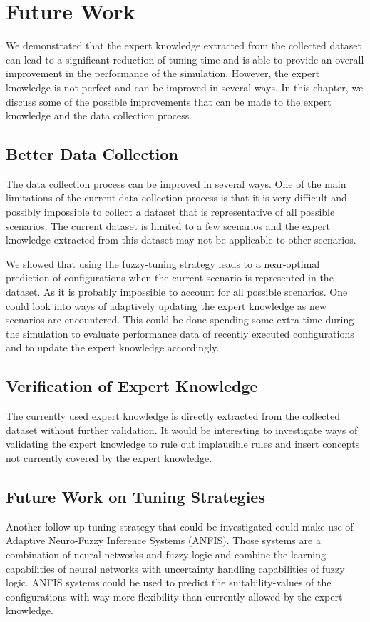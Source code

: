 \chapter{Future Work}
\label{sec:future_work}


We demonstrated that the expert knowledge extracted from the collected dataset can lead to a significant reduction of tuning time and is able to provide an overall improvement in the performance of the simulation. However, the expert knowledge is not perfect and can be improved in several ways. In this chapter, we discuss some of the possible improvements that can be made to the expert knowledge and the data collection process.

\section{Better Data Collection}

The data collection process can be improved in several ways. One of the main limitations of the current data collection process is that it is very difficult and possibly impossible to collect a dataset that is representative of all possible scenarios. The current dataset is limited to a few scenarios and the expert knowledge extracted from this dataset may not be applicable to other scenarios.

We showed that using the fuzzy-tuning strategy leads to a near-optimal prediction of configurations when the current scenario is represented in the dataset. As it is probably impossible to account for all possible scenarios. One could look into ways of adaptively updating the expert knowledge as new scenarios are encountered. This could be done spending some extra time during the simulation to evaluate performance data of recently executed configurations and to update the expert knowledge accordingly.

\section{Verification of Expert Knowledge}

The currently used expert knowledge is directly extracted from the collected dataset without further validation. It would be interesting to investigate ways of validating the expert knowledge to rule out implausible rules and insert concepts not currently covered by the expert knowledge.

\section{Future Work on Tuning Strategies}

Another follow-up tuning strategy that could be investigated could make use of Adaptive Neuro-Fuzzy Inference Systems (ANFIS). Those systems are a combination of neural networks and fuzzy logic and combine the learning capabilities of neural networks with uncertainty handling capabilities of fuzzy logic. ANFIS systems could be used to predict the suitability-values of the configurations with way more flexibility than currently allowed by the expert knowledge.